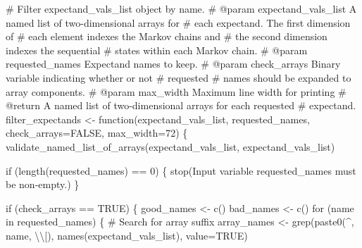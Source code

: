 \documentclass[
  letterpaper,
  DIV=11,
  numbers=noendperiod]{scrartcl}
\newenvironment{Shaded}{\begin{snugshade}}{\end{snugshade}}
\newcommand{\CharTok}[1]{\textcolor[rgb]{0.13,0.47,0.30}{#1}}
\newcommand{\CommentTok}[1]{\textcolor[rgb]{0.37,0.37,0.37}{#1}}
\newcommand{\ControlFlowTok}[1]{\textcolor[rgb]{0.00,0.23,0.31}{#1}}
\newcommand{\DecValTok}[1]{\textcolor[rgb]{0.68,0.00,0.00}{#1}}
\newcommand{\KeywordTok}[1]{\textcolor[rgb]{0.00,0.23,0.31}{#1}}
\newcommand{\NormalTok}[1]{\textcolor[rgb]{0.00,0.23,0.31}{#1}}
\newcommand{\OperatorTok}[1]{\textcolor[rgb]{0.37,0.37,0.37}{#1}}
\newcommand{\StringTok}[1]{\textcolor[rgb]{0.13,0.47,0.30}{#1}}
\begin{document}
\begin{Shaded}
\begin{Highlighting}[]
\CommentTok{\# Filter \textasciigrave{}expectand\_vals\_list\textasciigrave{} object by name.}
\CommentTok{\# @param expectand\_vals\_list A named list of two{-}dimensional arrays for}
\CommentTok{\#                            each expectand.  The first dimension of}
\CommentTok{\#                            each element indexes the Markov chains and}
\CommentTok{\#                            the second dimension indexes the sequential}
\CommentTok{\#                            states within each Markov chain.}
\CommentTok{\# @param requested\_names Expectand names to keep.}
\CommentTok{\# @param check\_arrays Binary variable indicating whether or not}
\CommentTok{\#                     requested}
\CommentTok{\#                     names should be expanded to array components.}
\CommentTok{\# @param max\_width Maximum line width for printing}
\CommentTok{\# @return A named list of two{-}dimensional arrays for each requested}
\CommentTok{\#         expectand.}
\NormalTok{filter\_expectands }\OperatorTok{\textless{}{-}}\NormalTok{ function(expectand\_vals\_list, requested\_names,}
\NormalTok{                              check\_arrays}\OperatorTok{=}\NormalTok{FALSE, max\_width}\OperatorTok{=}\DecValTok{72}\NormalTok{) \{}
\NormalTok{  validate\_named\_list\_of\_arrays(expectand\_vals\_list,}
                                \StringTok{\textquotesingle{}expectand\_vals\_list\textquotesingle{}}\NormalTok{)}
  
  \ControlFlowTok{if}\NormalTok{ (length(requested\_names) }\OperatorTok{==} \DecValTok{0}\NormalTok{) \{}
\NormalTok{    stop(}\StringTok{\textquotesingle{}Input variable requested\_names must be non{-}empty.\textquotesingle{}}\NormalTok{)}
\NormalTok{  \}}
  
  \ControlFlowTok{if}\NormalTok{ (check\_arrays }\OperatorTok{==}\NormalTok{ TRUE) \{}
\NormalTok{    good\_names }\OperatorTok{\textless{}{-}}\NormalTok{ c()}
\NormalTok{    bad\_names }\OperatorTok{\textless{}{-}}\NormalTok{ c()}
    \ControlFlowTok{for}\NormalTok{ (name }\KeywordTok{in}\NormalTok{ requested\_names) \{}
      \CommentTok{\# Search for array suffix}
\NormalTok{      array\_names }\OperatorTok{\textless{}{-}}\NormalTok{ grep(paste0(}\StringTok{\textquotesingle{}\^{}\textquotesingle{}}\NormalTok{, name, }\StringTok{\textquotesingle{}}\CharTok{\textbackslash{}\textbackslash{}}\StringTok{[\textquotesingle{}}\NormalTok{),}
\NormalTok{                          names(expectand\_vals\_list),}
\NormalTok{                          value}\OperatorTok{=}\NormalTok{TRUE)}
      

\end{Highlighting}
\end{Shaded}
\end{document}

